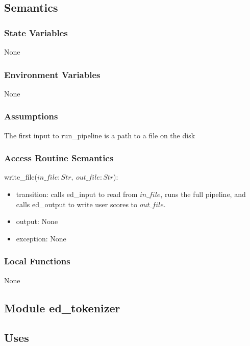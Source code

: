 \documentclass[12pt, titlepage]{article}
\begin{document}
\subsection{Semantics}

\subsubsection{State Variables}

None

\subsubsection{Environment Variables}

None

\subsubsection{Assumptions}

The first input to run\_pipeline is a path to a file on the disk

\subsubsection{Access Routine Semantics}

\noindent write\_file($in\_file: Str,\ out\_file: Str$):
\begin{itemize}
\item transition: calls ed\_input to read from $in\_file$, runs the full pipeline, and calls ed\_output to write user scores to $out\_file$.
\item output: None
\item exception: None
\end{itemize}

\subsubsection{Local Functions}

None


\subsection{Module ed\_tokenizer}

\subsection{Uses}
\end{document}
